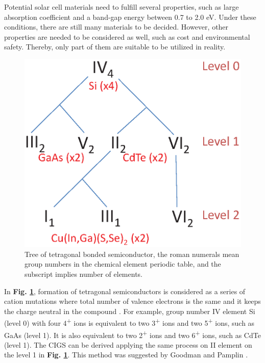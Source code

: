 \documentclass[a4paper, 12pt, titlepage,oneside,drop]{kthesis}
\begin{document}
Potential solar cell materials need to fulfill several properties, such as large absorption coefficient and a band-gap energy between 0.7 to 2.0 eV. Under these conditions, there are still many materials to be decided.
However, other properties are needed to be considered as well, such as cost and environmental safety. Thereby, only part of them are suitable to be utilized in reality.

\begin{figure}[H]
\centering
\includegraphics[scale=0.5]{tree.eps} 
\caption{Tree of tetragonal bonded semiconductor, the roman numerals mean group numbers in the chemical element periodic table, and the subscript implies number of elements.}
\label{lscm}
\end{figure}

In \textbf{Fig. \ref{lscm}}, formation of tetragonal semiconductors is considered as a series of cation mutations where total number of valence electrons is the same and it keeps the charge neutral in the compound \cite{chen2009electronic, chen2009crystal, walsh2009design}. For example, group number
IV element Si (level 0) with four 4\textsuperscript{+} ions is equivalent to two 3\textsuperscript{+} ions and two 5\textsuperscript{+} ions, such as GaAs (level 1). It is also equivalent to two 2\textsuperscript{+} ions
and two 6\textsuperscript{+} ions, such as CdTe (level 1). The CIGS can be derived applying the same process on II element on the level 1 in \textbf{Fig. \ref{lscm}}. This method was suggested by Goodman and Pamplin 
\cite{goodman1958prediction, pamplin1964systematic}. 
\end{document}
